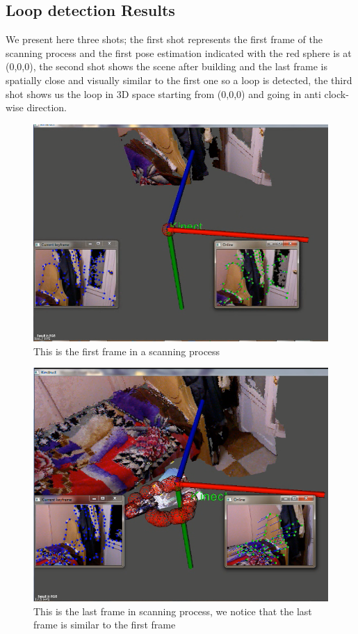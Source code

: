 \pagebreak
\subsection{Loop detection Results}

We present here three shots; the first shot represents the first frame of the scanning process and the first pose estimation indicated with the red sphere is at (0,0,0), the second shot shows the scene after building and the last frame is spatially close and visually similar to the first one so a loop is detected, the third shot shows us the loop in 3D space starting from (0,0,0) and going in anti clock-wise direction.

\begin{figure}[H]
\centering
\includegraphics{Loop/first_frame_loop.png}
\caption{This is the first frame in a scanning process }
\label{fig:first_frame_loop}
\end{figure}

\begin{figure}[H]
\centering
\includegraphics{Loop/last_frame_loop.png}
\caption{This is the last frame in scanning process, we notice that the last frame is similar to the first frame}
\label{fig:last_frame_loop}
\end{figure}

